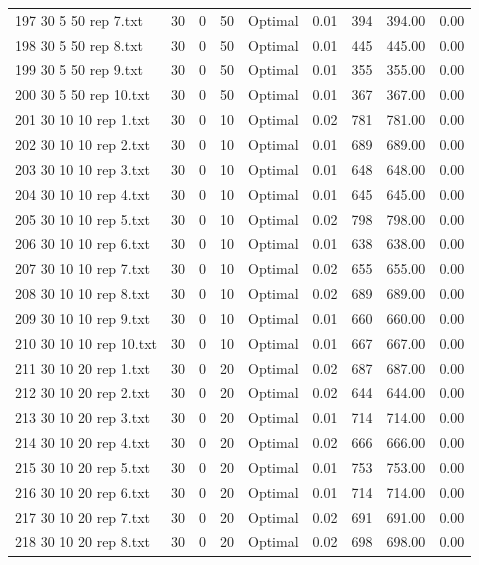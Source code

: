 \begin{longtable}{lrrllrrrr}
197 30 5 50 rep 7.txt & 30 & 0 & 50 & Optimal &  0.01 & 394 & 394.00 &  0.00\\
198 30 5 50 rep 8.txt & 30 & 0 & 50 & Optimal &  0.01 & 445 & 445.00 &  0.00\\
199 30 5 50 rep 9.txt & 30 & 0 & 50 & Optimal &  0.01 & 355 & 355.00 &  0.00\\
200 30 5 50 rep 10.txt & 30 & 0 & 50 & Optimal &  0.01 & 367 & 367.00 &  0.00\\
201 30 10 10 rep 1.txt & 30 & 0 & 10 & Optimal &  0.02 & 781 & 781.00 &  0.00\\
202 30 10 10 rep 2.txt & 30 & 0 & 10 & Optimal &  0.01 & 689 & 689.00 &  0.00\\
203 30 10 10 rep 3.txt & 30 & 0 & 10 & Optimal &  0.01 & 648 & 648.00 &  0.00\\
204 30 10 10 rep 4.txt & 30 & 0 & 10 & Optimal &  0.01 & 645 & 645.00 &  0.00\\
205 30 10 10 rep 5.txt & 30 & 0 & 10 & Optimal &  0.02 & 798 & 798.00 &  0.00\\
206 30 10 10 rep 6.txt & 30 & 0 & 10 & Optimal &  0.01 & 638 & 638.00 &  0.00\\
207 30 10 10 rep 7.txt & 30 & 0 & 10 & Optimal &  0.02 & 655 & 655.00 &  0.00\\
208 30 10 10 rep 8.txt & 30 & 0 & 10 & Optimal &  0.02 & 689 & 689.00 &  0.00\\
209 30 10 10 rep 9.txt & 30 & 0 & 10 & Optimal &  0.01 & 660 & 660.00 &  0.00\\
210 30 10 10 rep 10.txt & 30 & 0 & 10 & Optimal &  0.01 & 667 & 667.00 &  0.00\\
211 30 10 20 rep 1.txt & 30 & 0 & 20 & Optimal &  0.02 & 687 & 687.00 &  0.00\\
212 30 10 20 rep 2.txt & 30 & 0 & 20 & Optimal &  0.02 & 644 & 644.00 &  0.00\\
213 30 10 20 rep 3.txt & 30 & 0 & 20 & Optimal &  0.01 & 714 & 714.00 &  0.00\\
214 30 10 20 rep 4.txt & 30 & 0 & 20 & Optimal &  0.02 & 666 & 666.00 &  0.00\\
215 30 10 20 rep 5.txt & 30 & 0 & 20 & Optimal &  0.01 & 753 & 753.00 &  0.00\\
216 30 10 20 rep 6.txt & 30 & 0 & 20 & Optimal &  0.01 & 714 & 714.00 &  0.00\\
217 30 10 20 rep 7.txt & 30 & 0 & 20 & Optimal &  0.02 & 691 & 691.00 &  0.00\\
218 30 10 20 rep 8.txt & 30 & 0 & 20 & Optimal &  0.02 & 698 & 698.00 &  0.00\\

\end{longtable}
